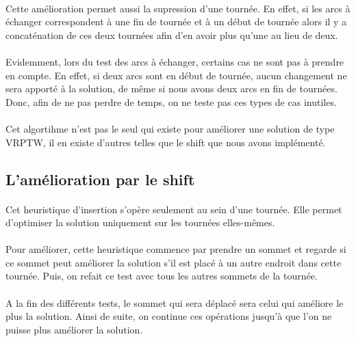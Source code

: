 \documentclass[12pt]{article}
\begin{document}
\paragraph{}
Cette amélioration permet aussi la supression d'une tournée. En effet, si les arcs à échanger correspondent à une fin de tournée et à un début de tournée 
alors il y a concaténation de ces deux tournées afin d'en avoir plus qu'une au lieu de deux.

\paragraph{}
Evidemment, lors du test des arcs à échanger, certains cas ne sont pas à prendre en compte. En effet, si deux arcs sont en début de tournée, aucun changement ne 
sera apporté à la solution, de même si nous avons deux arcs en fin de tournées. Donc, afin de ne pas perdre de temps, on ne teste pas ces types de 
cas inutiles.

\paragraph{}
Cet algortihme n'est pas le seul qui existe pour améliorer une solution de type VRPTW, il en existe d'autres telles que le shift que nous avons implémenté.

\subsection{L'amélioration par le shift}

\paragraph{}
Cet heuristique d'insertion s'opère seulement au sein d'une tournée. Elle permet d'optimiser la solution uniquement sur les tournées elles-mêmes.

\paragraph{}
Pour améliorer, cette heuristique commence par prendre un sommet et regarde si ce sommet peut améliorer la solution s'il est placé à un autre endroit 
dans cette tournée. Puis, on refait ce test avec tous les autres sommets de la tournée. 

\paragraph{}
A la fin des différents tests, le sommet qui sera déplacé sera celui qui améliore le plus la solution. Ainsi de suite, on continue ces opérations 
jusqu'à que l'on ne puisse plus améliorer la solution.
\end{document}
